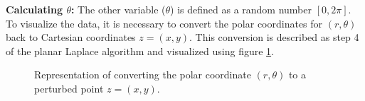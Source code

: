 \textbf{Calculating $\theta$:}
The other variable ($\theta$) is defined as a random number $[0, 2\pi]$. \newline
To visualize the data, it is necessary to convert the polar coordinates for $(r, \theta)$ back to Cartesian coordinates $z = (x, y)$.
This conversion is described as step 4 of the planar Laplace algorithm \citep{DBLP:journals/corr/abs-1212-1984} and visualized using figure \ref{figure:geo}.
\begin{figure}[h]
    \centering
  
  \centering
  \caption{Representation of converting the polar coordinate $(r, \theta)$ to a perturbed point $z = (x, y)$.}
  \label{figure:geo}
\end{figure}

\newpage
